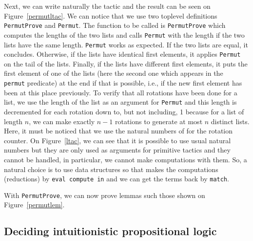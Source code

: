 Next, we can write naturally the tactic and the result can be seen on
Figure~\ref{permutltac}. We can notice that we use two toplevel
definitions {\tt PermutProve} and {\tt Permut}. The function to be
called is {\tt PermutProve} which computes the lengths of the two
lists and calls {\tt Permut} with the length if the two lists have the
same length. {\tt Permut} works as expected.  If the two lists are
equal, it concludes. Otherwise, if the lists have identical first
elements, it applies {\tt Permut} on the tail of the lists.  Finally,
if the lists have different first elements, it puts the first element
of one of the lists (here the second one which appears in the {\tt
  permut} predicate) at the end if that is possible, i.e., if the new
first element has been at this place previously. To verify that all
rotations have been done for a list, we use the length of the list as
an argument for {\tt Permut} and this length is decremented for each
rotation down to, but not including, 1 because for a list of length
$n$, we can make exactly $n-1$ rotations to generate at most $n$
distinct lists. Here, it must be noticed that we use the natural
numbers of {\Coq} for the rotation counter. On Figure~\ref{ltac}, we
can see that it is possible to use usual natural numbers but they are
only used as arguments for primitive tactics and they cannot be
handled, in particular, we cannot make computations with them. So, a
natural choice is to use {\Coq} data structures so that {\Coq} makes
the computations (reductions) by {\tt eval compute in} and we can get
the terms back by {\tt match}.

With {\tt PermutProve}, we can now prove lemmas such those shown on
Figure~\ref{permutlem}.


\subsection{Deciding intuitionistic propositional logic}

